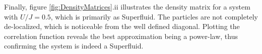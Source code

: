 Finally, figure \ref{fig:DensityMatrices}.ii illustrates the density matrix for a system with $U/J = 0.5$, which is primarily as Superfluid. The particles are not completely de-localized, which is noticeable from the well defined diagonal. Plotting the correlation function reveals the best approximation being a power-law, thus confirming the system is indeed a Superfluid. 



